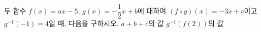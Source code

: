 두 함수 $f(x)=ax-5$, $g(x)=-\dfrac{1}{2}x+b$에 대하여 $(f\circ g)(x)=-3x+c$이고 $g^{-1}(-1)=4$일 때, 다음을 구하시오.
 $a+b+c$의 값
 $g^{-1}(f(2))$의 값
